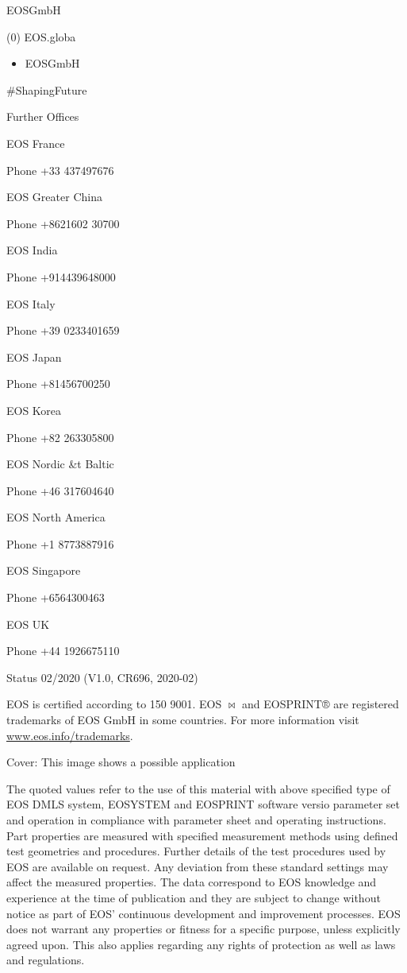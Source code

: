 \documentclass[10pt]{article}
\begin{document}
EOSGmbH

(0) EOS.globa

\begin{itemize}
  \item EOSGmbH
\end{itemize}

\#ShapingFuture

Further Offices

EOS France

Phone +33 437497676

EOS Greater China

Phone +8621602 30700

EOS India

Phone +914439648000

EOS Italy

Phone +39 0233401659

EOS Japan

Phone +81456700250

EOS Korea

Phone +82 263305800

EOS Nordic \&t Baltic

Phone +46 317604640

EOS North America

Phone +1 8773887916

EOS Singapore

Phone +6564300463

EOS UK

Phone +44 1926675110

Status 02/2020 (V1.0, CR696, 2020-02)

EOS is certified according to 150 9001. EOS $\bowtie$ and EOSPRINT® are registered trademarks of EOS GmbH in some countries. For more information visit \href{http://www.eos.info/trademarks}{www.eos.info/trademarks}.

Cover: This image shows a possible application

The quoted values refer to the use of this material with above specified type of EOS DMLS system, EOSYSTEM and EOSPRINT software versio parameter set and operation in compliance with parameter sheet and operating instructions. Part properties are measured with specified measurement methods using defined test geometries and procedures. Further details of the test procedures used by EOS are available on request. Any deviation from these standard settings may affect the measured properties. The data correspond to EOS knowledge and experience at the time of publication and they are subject to change without notice as part of EOS' continuous development and improvement processes. EOS does not warrant any properties or fitness for a specific purpose, unless explicitly agreed upon. This also applies regarding any rights of protection as well as laws and regulations.
\end{document}
